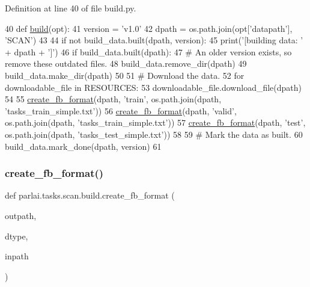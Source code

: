 Definition at line 40 of file build.\+py.


\begin{DoxyCode}
40 \textcolor{keyword}{def }\hyperlink{namespacedialog__babi__feedback_1_1build_a7a9d289f7493a5ded13c4b7f071b6184}{build}(opt):
41     version = \textcolor{stringliteral}{'v1.0'}
42     dpath = os.path.join(opt[\textcolor{stringliteral}{'datapath'}], \textcolor{stringliteral}{'SCAN'})
43 
44     \textcolor{keywordflow}{if} \textcolor{keywordflow}{not} build\_data.built(dpath, version):
45         print(\textcolor{stringliteral}{'[building data: '} + dpath + \textcolor{stringliteral}{']'})
46         \textcolor{keywordflow}{if} build\_data.built(dpath):
47             \textcolor{comment}{# An older version exists, so remove these outdated files.}
48             build\_data.remove\_dir(dpath)
49         build\_data.make\_dir(dpath)
50 
51         \textcolor{comment}{# Download the data.}
52         \textcolor{keywordflow}{for} downloadable\_file \textcolor{keywordflow}{in} RESOURCES:
53             downloadable\_file.download\_file(dpath)
54 
55         \hyperlink{namespaceparlai_1_1tasks_1_1wikiqa_1_1build_a554828702769592403db58c955d1dfe3}{create\_fb\_format}(dpath, \textcolor{stringliteral}{'train'}, os.path.join(dpath, \textcolor{stringliteral}{'tasks\_train\_simple.txt'}))
56         \hyperlink{namespaceparlai_1_1tasks_1_1wikiqa_1_1build_a554828702769592403db58c955d1dfe3}{create\_fb\_format}(dpath, \textcolor{stringliteral}{'valid'}, os.path.join(dpath, \textcolor{stringliteral}{'tasks\_train\_simple.txt'}))
57         \hyperlink{namespaceparlai_1_1tasks_1_1wikiqa_1_1build_a554828702769592403db58c955d1dfe3}{create\_fb\_format}(dpath, \textcolor{stringliteral}{'test'}, os.path.join(dpath, \textcolor{stringliteral}{'tasks\_test\_simple.txt'}))
58 
59         \textcolor{comment}{# Mark the data as built.}
60         build\_data.mark\_done(dpath, version)
61 \end{DoxyCode}
\mbox{\label{namespaceparlai_1_1tasks_1_1scan_1_1build_acd920598e2932f5f8db51dcf6e25a00c}} 
\subsubsection{\texorpdfstring{create\+\_\+fb\+\_\+format()}{create\_fb\_format()}}
{\footnotesize\ttfamily def parlai.\+tasks.\+scan.\+build.\+create\+\_\+fb\+\_\+format (\begin{DoxyParamCaption}\item[{}]{outpath,  }\item[{}]{dtype,  }\item[{}]{inpath }\end{DoxyParamCaption})}



